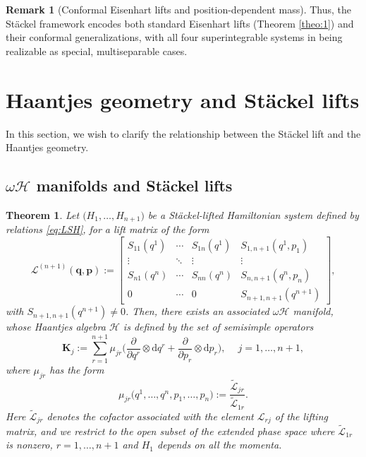 \documentclass[10pt]{amsart}
\numberwithin{equation}{section}
\newcommand{\bs}{\boldsymbol}
\newtheorem{theorem}{Theorem}
\theoremstyle{definition}
\newtheorem{remark}{\textbf{Remark}}
\begin{document}
\begin{remark}[Conformal Eisenhart lifts and position-dependent mass]
	Thus, the Stäckel framework encodes both standard Eisenhart lifts (Theorem \ref{theo:1}) and their conformal generalizations, with all four superintegrable systems in \cite{Carinena2017} being realizable as special, multiseparable cases.
\end{remark}

	\section{Haantjes geometry and St\"ackel lifts} \label{sec:4}
	
	In this section, we wish to clarify the relationship between the St\"ackel lift and the Haantjes geometry.
	
	\subsection{$\omega\mathscr{H}$ manifolds and St\"ackel lifts}
	\begin{theorem} \label{maintheorem}
		Let $\big(H_1,\ldots,H_{n+1}\big)$ be a St\"ackel-lifted Hamiltonian system defined by relations \eqref{eq:LSH}, for a lift matrix of the form
		\begin{equation} 
			\mathcal{L}^{(n+1)}(\bs{q}, \bs{p}):= \left[\begin{array}{ccc|ccc}
				S_{11}(q^1)& \cdots & S_{1n}(q^1) & S_{1,n+1}(q^1,p_1) \\ 
				\vdots &\ddots & \vdots & \vdots \\
				S_{n1}(q^n) & \cdots & S_{nn}(q^n) &S_{n,n+1}(q^n,p_n)\\ \hline
				0 & \cdots & 0 & S_{n+1,n+1}(q^{n+1})
			\end{array}\right],
		\end{equation}
		with $ S_{n+1,n+1}(q^{n+1})\neq 0$. Then, there exists an associated $\omega \mathscr{H}$ manifold, whose Haantjes algebra $\mathscr{H}$ is defined by the set of semisimple operators
		\begin{equation} \label{eq:HaaK}
			\boldsymbol{K}_{j}:=\sum_{r=1}^{n+1} \mu_{jr}\bigg( \frac{\partial}{\partial q^r}\otimes \mathrm{d} q^r+ \frac{\partial}{\partial p_r}\otimes \mathrm{d} p_r\bigg),
			\quad \ j=1,\ldots,n+1,
		\end{equation}
		where $\mu_{jr}$ has the form
		\begin{equation} \label{eq:mu}
			\mu_{jr}\big(q^1,\ldots, q^n,p_1,\ldots,p_n\big):=\dfrac{\tilde{\mathcal{L}}_{jr }}{\tilde{\mathcal{L}}_{1r}}.
		\end{equation}
Here $\tilde{\mathcal{L}}_{jr}$ denotes the cofactor associated with the element $\mathcal{L}_{rj}$ of the lifting matrix, and we restrict to the open subset of the extended phase space where $\tilde{\mathcal{L}}_{1r}$ is nonzero, $r = 1,\ldots, n+1$ and $H_1$ depends on all the momenta.
	\end{theorem}
\end{document}
